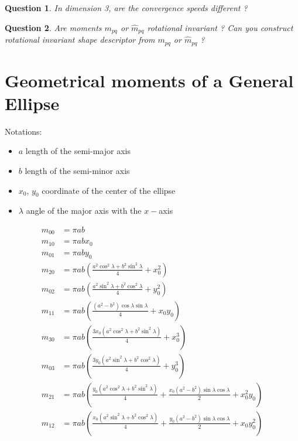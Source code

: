 \documentclass[a4paper, 11pt]{article}
\newtheorem{qu}{Question}
\begin{document}
\begin{qu}
  In dimension 3, are the convergence speeds different ?
\end{qu}


\begin{qu}
  Are moments $m_{pq}$ or $\hat{m}_{pq}$ rotational invariant ? Can
  you construct rotational invariant shape descriptor from $m_{pq}$ or
  $\hat{m}_{pq}$ ?
\end{qu}



\appendix
\section{Geometrical moments of a General Ellipse}

Notations:
\begin{itemize}
\item $a$ length of the semi-major axis
\item $b$ length of the semi-minor axis
\item $x_0$, $y_0$ coordinate of the center of the ellipse
\item $\lambda$ angle of the major axis with the $x-$axis
\end{itemize}


\begin{align}
m_{00} &= \pi ab\\
m_{10} &= \pi ab x_0\\
m_{01} &= \pi ab y_0\\
m_{20} &= \pi ab\left( \frac{a^2\cos^2\lambda + b^2\sin^2\lambda}{4} + x_0^2\right)\\
m_{02} &= \pi ab\left( \frac{a^2\sin^2\lambda + b^2\cos^2\lambda}{4} + y_0^2\right)\\
m_{11} &= \pi ab\left( \frac{(a^2-b^2)\cos\lambda\sin\lambda}{4} + x_0y_0\right)\\
m_{30} &= \pi ab\left( \frac{3x_0(a^2\cos^2\lambda + b^2\sin^2\lambda)}{4} + x_0^3\right)\\
m_{03} &= \pi ab\left( \frac{3y_0(a^2\sin^2\lambda + b^2\cos^2\lambda)}{4} + y_0^3\right)\\
m_{21} &= \pi ab\left( \frac{y_0(a^2\cos^2\lambda + b^2\sin^2\lambda)}{4} +  \frac{x_0(a^2-b^2)\sin\lambda\cos{\lambda}}{2} + x_0^2y_0\right)\\
m_{12} &= \pi ab\left( \frac{x_0(a^2\sin^2\lambda + b^2\cos^2\lambda)}{4} +  \frac{y_0(a^2-b^2)\sin\lambda\cos\lambda}{2} + x_0y_0^2\right)
\end{align}
\end{document}
